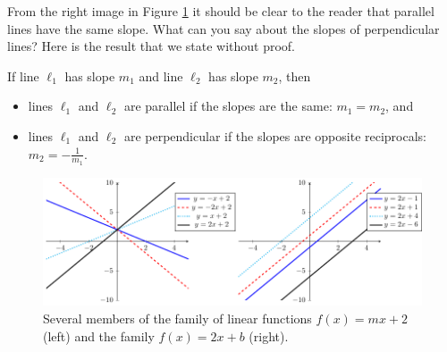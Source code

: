 From the right image in Figure \ref{fig:0.1.fam1} it should be clear to the reader that
parallel lines have the same slope.  What can you say about the slopes of perpendicular
lines?  Here is the result that we state without proof.
\begin{theorem}\label{thm:test}
If line $\ell_1$ has slope $m_1$ and line $\ell_2$ has slope $m_2$, then 
    \begin{itemize}
        \item lines $\ell_1$ and $\ell_2$ are parallel if the slopes are the same: $m_1 = m_2$,
            and
        \item lines $\ell_1$ and $\ell_2$ are perpendicular if the slopes are opposite
            reciprocals: $m_2 = -\frac{1}{m_1}$.
    \end{itemize}
\end{theorem}

\def\scl{0.8}
\begin{figure}[ht]
    \centering
    \includegraphics[width=0.9\columnwidth]{figures/0-1-fig5.pdf}
    \caption{Several members of the family of linear functions $f(x) = mx+2$ (left) and
    the family $f(x) = 2x+b$ (right).}
    \label{fig:0.1.fam1}
\end{figure}


